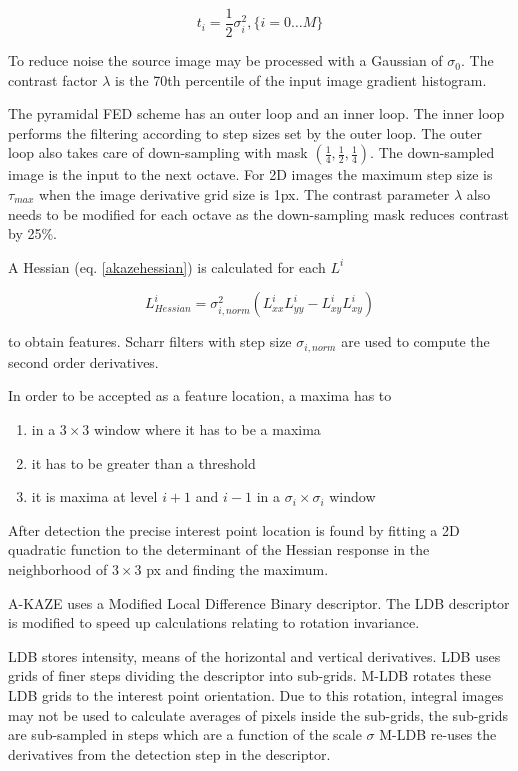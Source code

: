 \documentclass[english,12pt,a4paper,pdftex,elec,utf8]{aaltothesis}
\begin{document}
\begin{equation}
  \label{scaletotime}
t_i = \frac{1}{2}\sigma^2_i,\{i=0\ldots M\}
\end{equation}

To reduce noise the source image may be processed with a Gaussian of $\sigma_0$. The contrast factor $\lambda$ is the 70th percentile of the input image gradient histogram.

The pyramidal FED scheme has an outer loop and an inner loop. The inner loop performs the filtering according to step sizes set by the outer loop. The outer loop also takes care of down-sampling with mask $(\frac{1}{4}, \frac{1}{2}, \frac{1}{4})$. The down-sampled image is the input to the next octave. For 2D images the maximum step size is $\tau_{max}$ when the image derivative grid size is 1px. The contrast parameter $\lambda$ also needs to be modified for each octave as the down-sampling mask reduces contrast by 25\%.

A Hessian (eq. \ref{akazehessian}) is calculated for each $L^i$

\begin{equation}
  \label{akazehessian}
L^i_{Hessian} = \sigma^2_{i,norm}(L^i_{xx}L^i_{yy}-L^i_{xy}L^i_{xy})
\end{equation}

to obtain features. Scharr filters with step size $\sigma_{i,norm}$ are used to compute the second order derivatives.

In order to be accepted as a feature location, a maxima has to

\begin{enumerate}
\item in a $3 \times 3$ window where it has to be a maxima
\item it has to be greater than a threshold
\item it is maxima at level $i+1$ and $i-1$ in a $\sigma_i\times\sigma_i$ window
\end{enumerate}

After detection the precise interest point location is found by fitting a 2D quadratic function to the determinant of the Hessian response in the neighborhood of $3 \times 3$ px and finding the maximum.

A-KAZE uses a Modified Local Difference Binary descriptor. The LDB descriptor is modified to speed up calculations relating to rotation invariance.

LDB stores intensity, means of the horizontal and vertical derivatives. LDB uses grids of finer steps dividing the descriptor into sub-grids. M-LDB rotates these LDB grids to the interest point orientation. Due to this rotation, integral images may not be used to calculate averages of pixels inside the sub-grids, the sub-grids are sub-sampled in steps which are a function of the scale $\sigma$ M-LDB re-uses the derivatives from the detection step in the descriptor.
\end{document}
